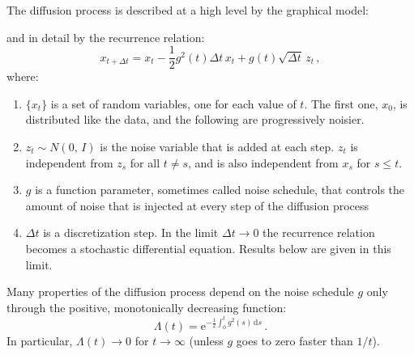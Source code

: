 \documentclass[10pt,letterpaper]{article}
\newcommand{\dd}{\mathrm{d}}
\newcommand{\ee}{\mathrm{e}}
\newcommand{\normal}[2]{N\!\left(#1,\,#2\right)}
\begin{document}
The diffusion process is described at a high level by the graphical model:
\begin{center}
\end{center}
and in detail by the recurrence relation:
\begin{equation}
    x_{t + \Delta t} = x_{t} - \frac{1}{2} g^2(t) \Delta t\, x_t + g(t) \sqrt{\Delta t}\, z_{t}\,,
\end{equation}
where:
\begin{enumerate}
\item $\{x_t\}$ is a set of random variables, one for each value of $t$. The
    first one, $x_0$, is distributed like the data, and the following are
    progressively noisier.
\item $z_t \sim \normal{0}{I}$ is the noise variable that is added at each step.
    $z_t$ is independent from $z_s$ for all $t \neq s$, and is also independent
    from $x_s$ for $s \leq t$.
\item $g$ is a function parameter, sometimes called noise schedule, that
    controls the amount of noise that is injected at every step of the
    diffusion process
\item $\Delta t$ is a discretization step. In the limit $\Delta t \to 0$ the
    recurrence relation becomes a stochastic differential equation. Results
    below are given in this limit.
\end{enumerate}

Many properties of the diffusion process depend on the noise schedule $g$ only
through the positive, monotonically decreasing function:
\begin{equation}
    \Lambda(t) = \ee^{-\frac{1}{2} \int_0^{t} g^2(s)\, \dd s}\,.
\end{equation}
In particular, $\Lambda(t) \to 0$ for $t \to \infty$ (unless $g$ goes to zero
faster than $1/t$).
\end{document}
